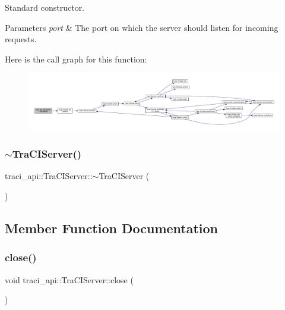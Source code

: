 Standard constructor. 


\begin{DoxyParams}{Parameters}
{\em port} & The port on which the server should listen for incoming requests. \\
\hline
\end{DoxyParams}
Here is the call graph for this function\+:
\nopagebreak
\begin{figure}[H]
\begin{center}
\leavevmode
\includegraphics[width=350pt]{classtraci__api_1_1_tra_c_i_server_a9960233a10a2c3790c375f91eec00b12_cgraph}
\end{center}
\end{figure}
\mbox{\label{classtraci__api_1_1_tra_c_i_server_a8ddc7d9ea6812c937cdaa06a00026eba}} 
\subsubsection{\texorpdfstring{$\sim$\+Tra\+C\+I\+Server()}{~TraCIServer()}}
{\footnotesize\ttfamily traci\+\_\+api\+::\+Tra\+C\+I\+Server\+::$\sim$\+Tra\+C\+I\+Server (\begin{DoxyParamCaption}{ }\end{DoxyParamCaption})}



\subsection{Member Function Documentation}
\mbox{\label{classtraci__api_1_1_tra_c_i_server_a1fd920907cde7ef5a10d078aec34080a}} 
\subsubsection{\texorpdfstring{close()}{close()}}
{\footnotesize\ttfamily void traci\+\_\+api\+::\+Tra\+C\+I\+Server\+::close (\begin{DoxyParamCaption}{ }\end{DoxyParamCaption})}




